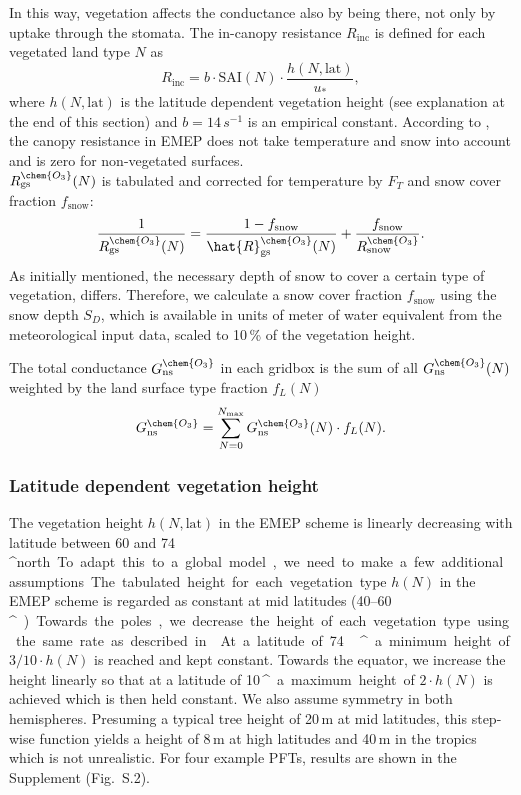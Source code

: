 \documentclass[gmd, manuscript]{copernicus}
\begin{document}
In this way, vegetation affects the conductance also by being there, not only by uptake through the stomata. The in-canopy resistance $R_\text{inc}$ is defined for each vegetated land type $N$ as
\begin{equation}
  R_\text{inc} = b \cdot \text{SAI}(N) \cdot \frac{h(N, \text{lat})}{u_*},
\end{equation}
where $h(N, \text{lat})$ is the latitude dependent vegetation height (see explanation at the end of this section) and $b = 14\,\unit{s^{-1}}$ is an empirical constant. According to \citet{ACP:Simpson2012}, the canopy resistance in EMEP does not take temperature and snow into account and is zero for non-vegetated surfaces.\\
$R_\text{gs}^\chem{O_3}(N)$ is tabulated and corrected for temperature by $F_T$ and snow cover fraction $f_\text{snow}$:
\begin{equation}
  \frac{1}{R_\text{gs}^\chem{O_3}(N)} = \frac{1-f_\text{snow}}{\hat{R}_\text{gs}^\chem{O_3}(N)} + \frac{f_\text{snow}}{R_\text{snow}^\chem{O_3}}.
\end{equation}
As initially mentioned, the necessary depth of snow to cover a certain type of vegetation, differs. Therefore, we calculate a snow cover fraction $f_\text{snow}$ using the snow depth $S_D$, which is available in units of meter of water equivalent from the meteorological input data, scaled to 10\,\unit{\%} of the vegetation height.

The total conductance $G_\text{ns}^\chem{O_3}$ in each gridbox is the sum of all $G_\text{ns}^\chem{O_3}(N)$ weighted by the land surface type fraction $f_L(N)$
\begin{equation}
  G_\text{ns}^\chem{O_3} = \sum_{N=0}^{N_\text{max}}{G_\text{ns}^\chem{O_3}(N) \cdot f_L(N)}.
\end{equation}

\subsubsection*{Latitude dependent vegetation height}
The vegetation height $h(N, \text{lat})$ in the EMEP scheme is linearly decreasing with latitude between 60 and 74\,\unit{^\circ north}. To adapt this to a global model, we need to make a few additional assumptions. The tabulated height for each vegetation type $h(N)$ in the EMEP scheme is regarded as constant at mid latitudes (40--60\,\unit{^\circ}). Towards the poles, we decrease the height of each vegetation type using the same rate as described in \citet{ACP:Simpson2012}. At a latitude of 74\,\unit{^\circ} a minimum height of $3/10 \cdot h(N)$ is reached and kept constant. Towards the equator, we increase the height linearly so that at a latitude of 10\,\unit{^\circ} a maximum height of $2 \cdot h(N)$ is achieved which is then held constant. We also assume symmetry in both hemispheres. Presuming a typical tree height of 20\,\unit{m} at mid latitudes, this step-wise function yields a height of 8\,\unit{m} at high latitudes and 40\,\unit{m} in the tropics which is not unrealistic. For four example PFTs, results are shown in the Supplement (Fig.~S.2). 
\end{document}
